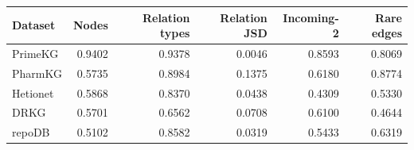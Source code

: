 \begin{tabular}{lrrrrr}
\toprule
Dataset & Nodes & Relation types & Relation JSD & Incoming-2 & Rare edges \\
\midrule
PrimeKG & 0.9402 & 0.9378 & 0.0046 & 0.8593 & 0.8069 \\
PharmKG & 0.5735 & 0.8984 & 0.1375 & 0.6180 & 0.8774 \\
Hetionet & 0.5868 & 0.8370 & 0.0438 & 0.4309 & 0.5330 \\
DRKG & 0.5701 & 0.6562 & 0.0708 & 0.6100 & 0.4644 \\
repoDB & 0.5102 & 0.8582 & 0.0319 & 0.5433 & 0.6319 \\
\bottomrule
\end{tabular}
